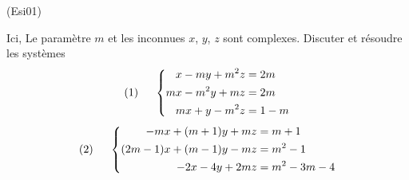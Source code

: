 \begin{tiny}(Esi01)\end{tiny}
Ici, Le paramètre $m$ et les inconnues $x$, $y$, $z$ sont complexes. Discuter et résoudre les systèmes
\begin{displaymath}
 (1)\hspace{0.5cm}\left\lbrace 
\begin{aligned}
 x-my+m^2z &=2m\\
mx-m^2y+mz &=2m\\
mx+y-m^2z &=1-m
\end{aligned}
\right. 
\end{displaymath}
 \begin{displaymath}
 (2)\hspace{0.5cm}\left\lbrace 
\begin{aligned}
 -mx+(m+1)y+mz &= m+1\\
(2m-1)x+(m-1)y-mz &= m^2-1\\
-2x-4y+2mz &=m^2-3m-4
\end{aligned}
\right. 
\end{displaymath}

